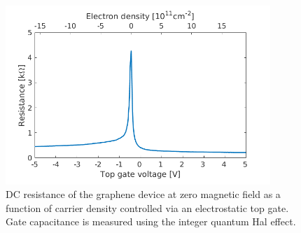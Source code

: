 \begin{figure}
\centering
\includegraphics[width=100mm]{figures/magneto/R.png}
\caption{DC resistance of the graphene device at zero magnetic field as a function of carrier density controlled via an electrostatic top gate. Gate capacitance is measured using the integer quantum Hal effect.}
\label{fig:m_R}
\end{figure}

